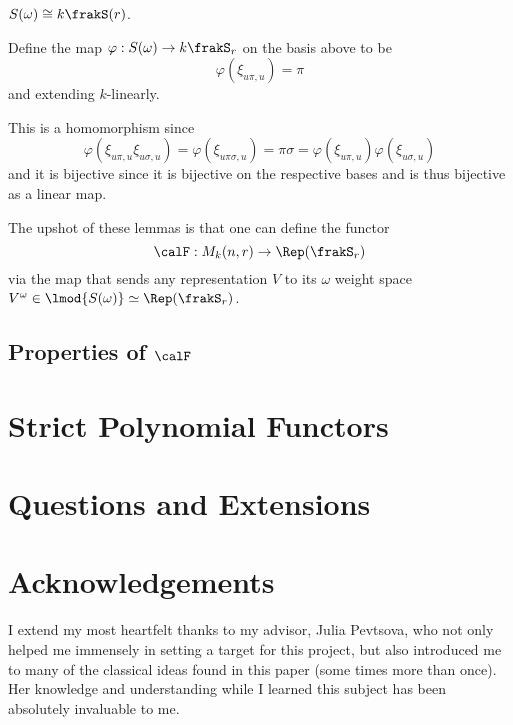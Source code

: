 \documentclass[12pt]{article}
\begin{document}
\begin{lem}
	$S(\omega)\cong k\frakS(r)$.
\end{lem}
\begin{prf}
	Define the map $\varphi:S(\omega)\to k\frakS_r$ on the basis above to be 
	\[\varphi (\xi_{u\pi,u})=\pi\]
	and extending $k$-linearly.

	This is a homomorphism since 
	\[\varphi(\xi_{u\pi,u}\xi_{u\sigma,u})=\varphi(\xi_{u\pi\sigma,u})=\pi\sigma=\varphi(\xi_{u\pi,u})\varphi(\xi_{u\sigma,u})\]
	and it is bijective since it is bijective on the respective bases and is thus bijective as a linear map.
\end{prf}
The upshot of these lemmas is that one can define the functor 
\[\calF:M_k(n,r)\to \Rep(\frakS_r)\]
via the map that sends any representation $V$ to its $\omega$ weight space $V^\omega\in \lmod {S(\omega)}\simeq \Rep(\frakS_r)$.


\subsection{Properties of \texorpdfstring{$\calF$}{F}}




\section{Strict Polynomial Functors}



\section{Questions and Extensions}

\section*{Acknowledgements}
\label{sec:ack}
I extend my most heartfelt thanks to my advisor, Julia Pevtsova, who not only helped me immensely in setting a target 
for this project, but also introduced me to many of the classical ideas found in this paper (some times more than once). 
Her knowledge and understanding while I learned this subject has been absolutely invaluable to me.
\end{document}

